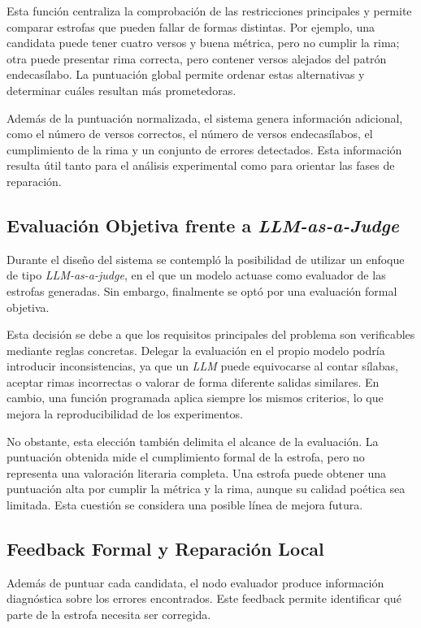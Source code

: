 \documentclass[12pt,a4paper,twoside,openright]{book}
\begin{document}
Esta función centraliza la comprobación de las restricciones principales y permite comparar estrofas que pueden fallar de formas distintas.
Por ejemplo, una candidata puede tener cuatro versos y buena métrica, pero no cumplir la rima; otra puede presentar rima correcta, pero contener versos alejados del patrón endecasílabo.
La puntuación global permite ordenar estas alternativas y determinar cuáles resultan más prometedoras.

Además de la puntuación normalizada, el sistema genera información adicional, como el número de versos correctos, el número de versos endecasílabos, el cumplimiento de la rima y un conjunto de errores detectados.
Esta información resulta útil tanto para el análisis experimental como para orientar las fases de reparación.


\subsection{Evaluación Objetiva frente a \emph{LLM-as-a-Judge}}

Durante el diseño del sistema se contempló la posibilidad de utilizar un enfoque de tipo \emph{LLM-as-a-judge}, en el que un modelo actuase como evaluador de las estrofas generadas. Sin embargo, finalmente se optó por una evaluación formal objetiva.

Esta decisión se debe a que los requisitos principales del problema son verificables mediante reglas concretas. Delegar la evaluación en el propio modelo podría introducir inconsistencias,
ya que un \emph{LLM} puede equivocarse al contar sílabas, aceptar rimas incorrectas o valorar de forma diferente salidas similares. En cambio, una función programada aplica siempre los mismos criterios, lo que mejora la reproducibilidad de los experimentos.

No obstante, esta elección también delimita el alcance de la evaluación. La puntuación obtenida mide el cumplimiento formal de la estrofa, pero no representa una valoración literaria completa.
Una estrofa puede obtener una puntuación alta por cumplir la métrica y la rima, aunque su calidad poética sea limitada. Esta cuestión se considera una posible línea de mejora futura.


\subsection{Feedback Formal y Reparación Local}

Además de puntuar cada candidata, el nodo evaluador produce información diagnóstica sobre los errores encontrados. Este feedback permite identificar qué parte de la estrofa necesita ser corregida.
\end{document}
